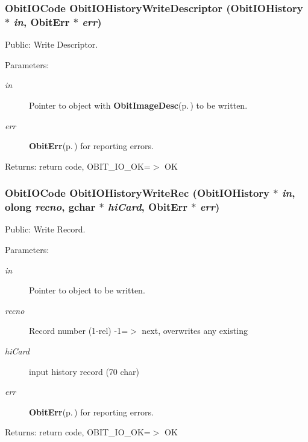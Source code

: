 \subsubsection{\setlength{\rightskip}{0pt plus 5cm}Obit\-IOCode Obit\-IOHistory\-Write\-Descriptor ({\bf Obit\-IOHistory} $\ast$ {\em in}, {\bf Obit\-Err} $\ast$ {\em err})}\label{ObitIOHistory_8h_a19}


Public: Write Descriptor. 

\begin{Desc}
\item[Parameters:]
\begin{description}
\item[{\em in}]Pointer to object with {\bf Obit\-Image\-Desc}{\rm (p.\,\pageref{structObitImageDesc})} to be written. \item[{\em err}]{\bf Obit\-Err}{\rm (p.\,\pageref{structObitErr})} for reporting errors. \end{description}
\end{Desc}
\begin{Desc}
\item[Returns:]return code, OBIT\_\-IO\_\-OK=$>$ OK \end{Desc}
\subsubsection{\setlength{\rightskip}{0pt plus 5cm}Obit\-IOCode Obit\-IOHistory\-Write\-Rec ({\bf Obit\-IOHistory} $\ast$ {\em in}, {\bf olong} {\em recno}, gchar $\ast$ {\em hi\-Card}, {\bf Obit\-Err} $\ast$ {\em err})}\label{ObitIOHistory_8h_a16}


Public: Write Record. 

\begin{Desc}
\item[Parameters:]
\begin{description}
\item[{\em in}]Pointer to object to be written. \item[{\em recno}]Record number (1-rel) -1=$>$ next, overwrites any existing \item[{\em hi\-Card}]input history record (70 char) \item[{\em err}]{\bf Obit\-Err}{\rm (p.\,\pageref{structObitErr})} for reporting errors. \end{description}
\end{Desc}
\begin{Desc}
\item[Returns:]return code, OBIT\_\-IO\_\-OK=$>$ OK \end{Desc}
